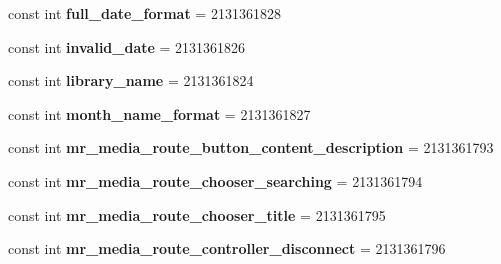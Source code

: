 \begin{DoxyCompactItemize}
\item 
\hypertarget{classClient_1_1Droid_1_1Resource_1_1String_afde5fa6ad9e9acde6265f47b4ad533c5}{}const int {\bfseries full\+\_\+date\+\_\+format} = 2131361828\label{classClient_1_1Droid_1_1Resource_1_1String_afde5fa6ad9e9acde6265f47b4ad533c5}

\item 
\hypertarget{classClient_1_1Droid_1_1Resource_1_1String_a07920158eeb3848587ea5e9f0f9b7dfb}{}const int {\bfseries invalid\+\_\+date} = 2131361826\label{classClient_1_1Droid_1_1Resource_1_1String_a07920158eeb3848587ea5e9f0f9b7dfb}

\item 
\hypertarget{classClient_1_1Droid_1_1Resource_1_1String_a47bf8fb4dd2e45a485604d0e0fd45ff7}{}const int {\bfseries library\+\_\+name} = 2131361824\label{classClient_1_1Droid_1_1Resource_1_1String_a47bf8fb4dd2e45a485604d0e0fd45ff7}

\item 
\hypertarget{classClient_1_1Droid_1_1Resource_1_1String_a63f34b0ce316d664137b727a3a80f68a}{}const int {\bfseries month\+\_\+name\+\_\+format} = 2131361827\label{classClient_1_1Droid_1_1Resource_1_1String_a63f34b0ce316d664137b727a3a80f68a}

\item 
\hypertarget{classClient_1_1Droid_1_1Resource_1_1String_a9ae4b9105e02fa0f5d95d3bfb4bc0b46}{}const int {\bfseries mr\+\_\+media\+\_\+route\+\_\+button\+\_\+content\+\_\+description} = 2131361793\label{classClient_1_1Droid_1_1Resource_1_1String_a9ae4b9105e02fa0f5d95d3bfb4bc0b46}

\item 
\hypertarget{classClient_1_1Droid_1_1Resource_1_1String_a80a2beed22704a38fadf654db5711f17}{}const int {\bfseries mr\+\_\+media\+\_\+route\+\_\+chooser\+\_\+searching} = 2131361794\label{classClient_1_1Droid_1_1Resource_1_1String_a80a2beed22704a38fadf654db5711f17}

\item 
\hypertarget{classClient_1_1Droid_1_1Resource_1_1String_acc9365b2ac139cb20f60cd96c4f8d5c6}{}const int {\bfseries mr\+\_\+media\+\_\+route\+\_\+chooser\+\_\+title} = 2131361795\label{classClient_1_1Droid_1_1Resource_1_1String_acc9365b2ac139cb20f60cd96c4f8d5c6}

\item 
\hypertarget{classClient_1_1Droid_1_1Resource_1_1String_a011508979cb1221cbcc01107953bda15}{}const int {\bfseries mr\+\_\+media\+\_\+route\+\_\+controller\+\_\+disconnect} = 2131361796\label{classClient_1_1Droid_1_1Resource_1_1String_a011508979cb1221cbcc01107953bda15}


\end{DoxyCompactItemize}
